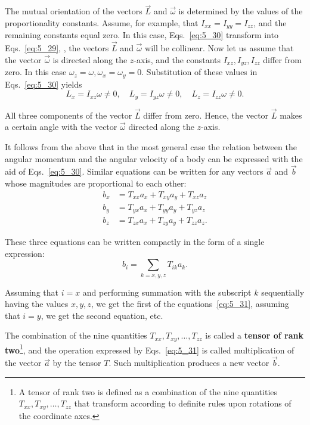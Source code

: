 The mutual orientation of the vectors $\vec{L}$ and $\vec{\omega}$ is determined by the values of the proportionality constants. Assume, for example, that $I_{xx}=I_{yy}=I_{zz}$, and the remaining constants equal zero. In this case, Eqs.~\eqref{eq:5_30} transform into Eqs.~\eqref{eq:5_29}, \ie, the vectors $\vec{L}$ and $\vec{\omega}$ will be collinear. Now let us assume that the vector $\vec{\omega}$ is directed along the $z$-axis, and the constants $I_{xz}, I_{yz}, I_{zz}$ differ from zero. In this case $\omega_z=\omega, \omega_x=\omega_y=0$. Substitution of these values in Eqs.~\eqref{eq:5_30} yields
\begin{equation*}
L_x = I_{xz}\omega\neq 0,\quad L_y = I_{yz}\omega\neq 0,\quad L_z = I_{zz}\omega\neq 0.
\end{equation*}

\noindent
All three components of the vector $\vec{L}$ differ from zero. Hence, the vector $\vec{L}$ makes a certain angle with the vector $\vec{\omega}$ directed along the $z$-axis.

It follows from the above that in the most general case the relation between the angular momentum and the angular velocity of a body can be expressed with the aid of Eqs.~\eqref{eq:5_30}. Similar equations can be written for any vectors $\vec{a}$ and $\vec{b}$ whose magnitudes are proportional to each other:
\begin{align}
	b_x &= T_{xx} a_x + T_{xy} a_y + T_{xz} a_z\nonumber\\
	b_y &= T_{yx} a_x + T_{yy} a_y + T_{yz} a_z \label{eq:5_31} \\
	b_z &= T_{zx} a_x + T_{zy} a_y + T_{zz} a_z.\nonumber
\end{align}

\noindent
These three equations can be written compactly in the form of a single expression:
\vspace{-12pt}
\begin{equation}\label{eq:5_32}
b_i = \sum_{k=x,y,z} T_{ik} a_k.
\end{equation}

\noindent
Assuming that $i=x$ and performing summation with the subscript $k$ sequentially having the values $x,y,z$, we get the first of the equations~\eqref{eq:5_31}, assuming that $i=y$, we get the second equation, etc.

The combination of the nine quantities $T_{xx}, T_{xy}, \ldots, T_{zz}$ is called a \textbf{tensor of rank two}\footnote{A tensor of rank two is defined as a combination of the nine quantities $T_{xx}, T_{xy}, \ldots, T_{zz}$ that transform according to definite rules upon rotations of the coordinate axes.}, and the operation expressed by Eqs.~\eqref{eq:5_31} is called multiplication of the vector $\vec{a}$ by the tensor $T$. Such multiplication produces a new vector $\vec{b}$.

